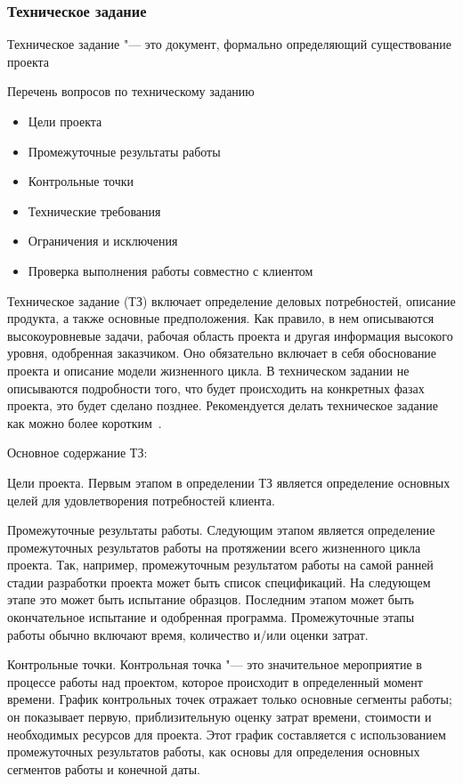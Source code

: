 \documentclass{../industrial-development}
\begin{document}
\begin{frame} \frametitle{Техническое задание}
  \begin{definition}
    Техническое задание "--- это документ, формально определяющий существование проекта
  \end{definition}
  \begin{block}{Перечень вопросов по техническому заданию}
    \begin{itemize}
     \item Цели проекта
     \item Промежуточные результаты работы
     \item Контрольные точки
     \item Технические требования
     \item Ограничения и исключения
     \item Проверка выполнения работы совместно с клиентом
    \end{itemize}
  \end{block}
\end{frame}

\lecturenotes

Техническое задание (ТЗ) включает определение деловых потребностей, описание продукта, а также основные предположения. Как правило, в нем описываются высокоуровневые задачи, рабочая область проекта и другая информация высокого уровня, одобренная заказчиком. Оно обязательно включает в себя обоснование проекта и описание модели жизненного цикла. В техническом задании не описываются подробности того, что будет происходить на конкретных фазах проекта, это будет сделано позднее. Рекомендуется делать техническое задание как можно более коротким~\cite[с.~250--251]{Fatrell}.

Основное содержание ТЗ:

Цели проекта. Первым этапом в определении ТЗ является определение основных целей для удовлетворения потребностей клиента.

Промежуточные результаты работы. Следующим этапом является определение промежуточных результатов работы на протяжении всего жизненного цикла проекта. Так, например, промежуточным результатом работы на самой ранней стадии разработки проекта может быть список спецификаций. На следующем этапе это может быть испытание образцов. Последним этапом может быть окончательное испытание и одобренная программа. Промежуточные этапы работы обычно включают время, количество и/или оценки затрат.

Контрольные точки. Контрольная точка "--- это значительное мероприятие в процессе работы над проектом, которое происходит в определенный момент времени. График контрольных точек отражает только основные сегменты работы; он показывает первую, приблизительную оценку затрат времени, стоимости и необходимых ресурсов для проекта. Этот график составляется с использованием промежуточных результатов работы, как основы для определения основных сегментов работы и конечной даты.
\end{document}
